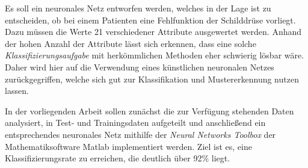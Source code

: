 Es soll ein neuronales Netz entworfen werden, welches in der Lage ist zu
entscheiden, ob bei einem Patienten eine Fehlfunktion der Schilddrüse vorliegt.
Dazu müssen die Werte 21 verschiedener Attribute ausgewertet werden. Anhand der
hohen Anzahl der Attribute lässt sich erkennen, dass eine solche
\emph{Klassifizierungsaufgabe} mit herkömmlichen Methoden eher schwierig lösbar
wäre. Daher wird hier auf die Verwendung eines künstlichen neuronalen Netzes
zurückgegriffen, welche sich gut zur Klassifikation und Mustererkennung nutzen
lassen.

In der vorliegenden Arbeit sollen zunächst die zur Verfügung stehenden Daten
analysiert, in Test- und Trainingsdaten aufgeteilt und anschließend ein
entsprechendes neuronales Netz mithilfe der \emph{Neural Networks Toolbox} der
Mathematiksoftware Matlab implementiert werden. Ziel ist es, eine
Klassifizierungsrate zu erreichen, die deutlich über 92\% liegt.

